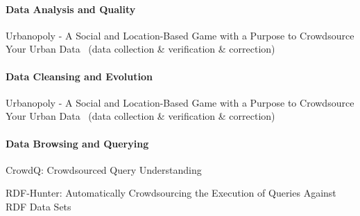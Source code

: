 \paragraph{Data Analysis and Quality}
Urbanopoly - A Social and Location-Based Game with a Purpose to Crowdsource Your Urban Data~\cite{celino2012} (data collection \& verification \& correction)

\paragraph{Data Cleansing and Evolution}
Urbanopoly - A Social and Location-Based Game with a Purpose to Crowdsource Your Urban Data~\cite{celino2012} (data collection \& verification \& correction)

\paragraph{Data Browsing and Querying}
CrowdQ: Crowdsourced Query Understanding~\cite{demartini2013}

RDF-Hunter: Automatically Crowdsourcing the Execution of Queries Against RDF Data Sets~\cite{acosta2015}


